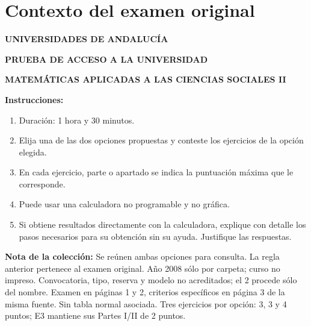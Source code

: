 \section*{Contexto del examen original}
\textbf{UNIVERSIDADES DE ANDALUCÍA}\par
\textbf{PRUEBA DE ACCESO A LA UNIVERSIDAD}\par
\textbf{MATEMÁTICAS APLICADAS A LAS CIENCIAS SOCIALES II}

\textbf{Instrucciones:}
\begin{enumerate}[label=\textbf{\alph*)}]
  \item Duración: 1 hora y 30 minutos.
  \item Elija una de las dos opciones propuestas y conteste los ejercicios de la opción elegida.
  \item En cada ejercicio, parte o apartado se indica la puntuación máxima que le corresponde.
  \item Puede usar una calculadora no programable y no gráfica.
  \item Si obtiene resultados directamente con la calculadora, explique con detalle los pasos necesarios para su obtención sin su ayuda. Justifique las respuestas.
\end{enumerate}
\noindent\textbf{Nota de la colección:} Se reúnen ambas opciones para consulta. La regla anterior pertenece al examen original. Año 2008 sólo por carpeta; curso no impreso. Convocatoria, tipo, reserva y modelo no acreditados; el 2 procede sólo del nombre. Examen en páginas 1 y 2, criterios específicos en página 3 de la misma fuente. Sin tabla normal asociada. Tres ejercicios por opción: 3, 3 y 4 puntos; E3 mantiene sus Partes I/II de 2 puntos.
\par\medskip
